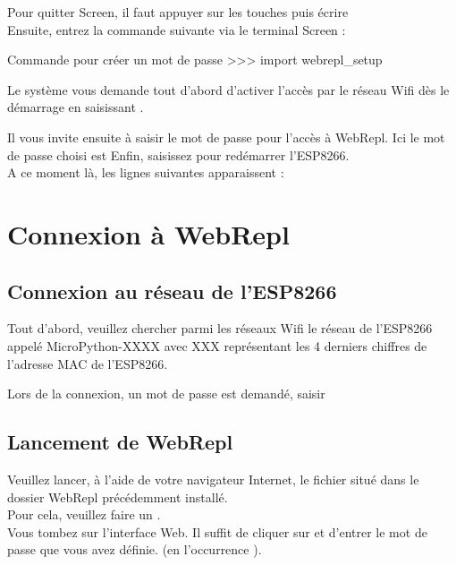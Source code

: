 Pour quitter Screen, il faut appuyer sur les touches  puis écrire  \\

Ensuite, entrez la commande suivante via le terminal Screen :
\begin{Bash}{Commande pour créer un mot de passe}
>>> import webrepl_setup
\end{Bash}

Le système vous demande tout d'abord d’activer l’accès par le réseau Wifi dès le démarrage en saisissant .


Il vous invite ensuite à saisir le mot de passe pour l'accès à WebRepl. Ici le mot de passe choisi est 
Enfin, saisissez  pour redémarrer l'ESP8266.\\
A ce moment là, les lignes suivantes apparaissent : 



\section{Connexion à WebRepl}



\subsection{Connexion au réseau de l'ESP8266}

Tout d'abord, veuillez chercher parmi les réseaux Wifi le réseau de l'ESP8266 appelé MicroPython-XXXX avec XXX représentant les 4 derniers chiffres de l'adresse MAC de l'ESP8266.

Lors de la connexion, un mot de passe est demandé, saisir 

\subsection{Lancement de WebRepl}

 Veuillez lancer, à l'aide de votre navigateur Internet, le fichier   situé dans le dossier WebRepl précédemment installé. \\
 Pour cela, veuillez faire un . \\
Vous tombez sur l’interface Web. Il suffit de cliquer sur  et d’entrer le mot de passe que vous avez définie.
(en l'occurrence ).


